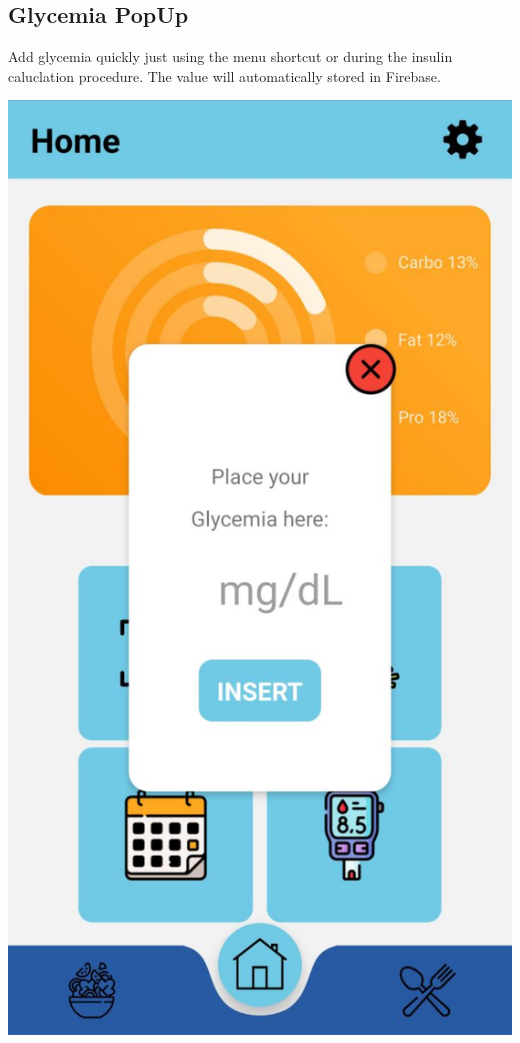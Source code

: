 \documentclass[12pt,hidelinks]{article}
\begin{document}
	\subsection{Glycemia PopUp}
    Add glycemia quickly just using the menu shortcut or during the insulin caluclation procedure. The value 
	will automatically stored in Firebase.
	\begin{center}

		\includegraphics[scale=0.2]{screenshot1}
	\end{center}
\end{document}
